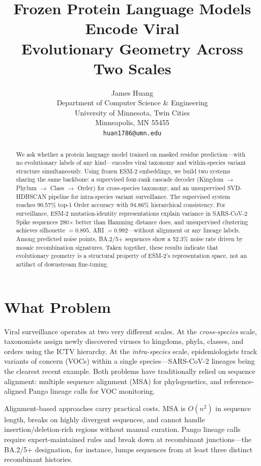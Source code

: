 \documentclass{article}
\title{Frozen Protein Language Models Encode Viral\\
Evolutionary Geometry Across Two Scales}
\author{%
  James Huang \\
  Department of Computer Science \& Engineering \\
  University of Minnesota, Twin Cities \\
  Minneapolis, MN 55455 \\
  \texttt{huan1786@umn.edu}
}
\begin{document}
\maketitle

\begin{abstract}
We ask whether a protein language model trained on masked residue prediction---with no evolutionary labels of any kind---encodes viral taxonomy and within-species variant structure simultaneously. Using frozen ESM-2 embeddings, we build two systems sharing the same backbone: a supervised four-rank cascade decoder (Kingdom $\to$ Phylum $\to$ Class $\to$ Order) for cross-species taxonomy, and an unsupervised SVD-HDBSCAN pipeline for intra-species variant surveillance. The supervised system reaches 90.57\% top-1 Order accuracy with 94.86\% hierarchical consistency. For surveillance, ESM-2 mutation-identity representations explain variance in SARS-CoV-2 Spike sequences 280$\times$ better than Hamming distance does, and unsupervised clustering achieves silhouette $= 0.895$, ARI $= 0.992$---without alignment or any lineage labels. Among predicted noise points, BA.2/5+ sequences show a 52.3\% noise rate driven by mosaic recombination signatures. Taken together, these results indicate that evolutionary geometry is a structural property of ESM-2's representation space, not an artifact of downstream fine-tuning.
\end{abstract}

\section{What Problem}
\label{sec:problem}

Viral surveillance operates at two very different scales. At the \textit{cross-species} scale, taxonomists assign newly discovered viruses to kingdoms, phyla, classes, and orders using the ICTV hierarchy. At the \textit{intra-species} scale, epidemiologists track variants of concern (VOCs) within a single species---SARS-CoV-2 lineages being the clearest recent example. Both problems have traditionally relied on sequence alignment: multiple sequence alignment (MSA) for phylogenetics, and reference-aligned Pango lineage calls for VOC monitoring.

Alignment-based approaches carry practical costs. MSA is $O(n^2)$ in sequence length, breaks on highly divergent sequences, and cannot handle insertion/deletion-rich regions without manual curation. Pango lineage calls require expert-maintained rules and break down at recombinant junctions---the BA.2/5+ designation, for instance, lumps sequences from at least three distinct recombinant histories.
\end{document}
